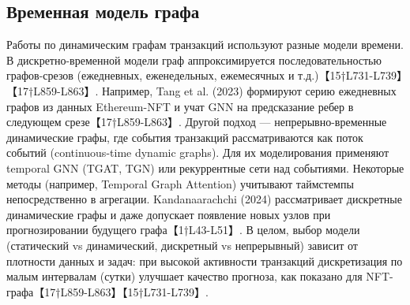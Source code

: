 \subsection{Временная модель графа}
Работы по динамическим графам транзакций используют разные модели времени. В дискретно-временной модели граф аппроксимируется последовательностью графов-срезов (ежедневных, еженедельных, ежемесячных и т.д.)【15†L731-L739】【17†L859-L863】. Например, Tang et al. (2023) формируют серию ежедневных графов из данных Ethereum-NFT и учат GNN на предсказание ребер в следующем срезе【17†L859-L863】. Другой подход — непрерывно-временные динамические графы, где события транзакций рассматриваются как поток событий (continuous-time dynamic graphs). Для их моделирования применяют temporal GNN (TGAT, TGN) или рекуррентные сети над событиями. Некоторые методы (например, Temporal Graph Attention) учитывают таймстемпы непосредственно в агрегации. Kandanaarachchi (2024) рассматривает дискретные динамические графы и даже допускает появление новых узлов при прогнозировании будущего графа【1†L43-L51】. В целом, выбор модели (статический vs динамический, дискретный vs непрерывный) зависит от плотности данных и задач: при высокой активности транзакций дискретизация по малым интервалам (сутки) улучшает качество прогноза, как показано для NFT-графа【17†L859-L863】【15†L731-L739】. 

